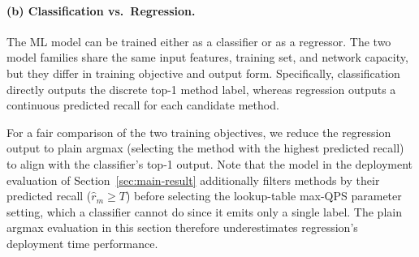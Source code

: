 



\paragraph{(b) Classification vs.\ Regression.}
\label{sssec:cls-vs-reg}

The ML model can be trained either as a classifier or as a regressor.
The two model families share the same input features, training set, and network capacity, but they differ in training objective and output form. Specifically, classification directly outputs the discrete top-1 method label, whereas regression outputs a continuous predicted recall for each candidate method.

For a fair comparison of the two training objectives, we reduce the regression output to plain argmax (selecting the method with the highest predicted recall) to align with the classifier's top-1 output.
Note that the model in the deployment evaluation of Section~\ref{sec:main-result} additionally filters methods by their predicted recall ($\hat{r}_m \geq T$) before selecting the lookup-table max-QPS parameter setting, which a classifier cannot do since it emits only a single label.
The plain argmax evaluation in this section therefore underestimates regression's deployment time performance.

